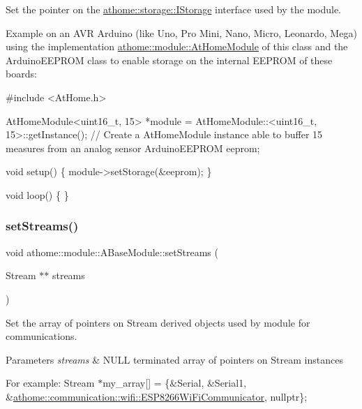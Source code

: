 Set the pointer on the \mbox{\hyperlink{classathome_1_1storage_1_1_i_storage}{athome\+::storage\+::\+I\+Storage}} interface used by the module.

Example on an A\+VR Arduino (like Uno, Pro Mini, Nano, Micro, Leonardo, Mega) using the implementation \mbox{\hyperlink{classathome_1_1module_1_1_at_home_module}{athome\+::module\+::\+At\+Home\+Module}} of this class and the Arduino\+E\+E\+P\+R\+OM class to enable storage on the internal E\+E\+P\+R\+OM of these boards\+:


\begin{DoxyCode}
\textcolor{preprocessor}{#include <AtHome.h>}

AtHomeModule<uint16\_t, 15> *module = AtHomeModule::<uint16\_t,
15>::getInstance(); \textcolor{comment}{// Create a AtHomeModule instance able to buffer 15}
measures from an analog sensor ArduinoEEPROM eeprom;

\textcolor{keywordtype}{void} setup() \{
  module->setStorage(&eeprom);
\}

\textcolor{keywordtype}{void} loop() \{
\}
\end{DoxyCode}
 \mbox{\label{classathome_1_1module_1_1_a_base_module_af1af8e6110a8d0baee15efb2275ae5ae}} 
\subsubsection{\texorpdfstring{set\+Streams()}{setStreams()}}
{\footnotesize\ttfamily void athome\+::module\+::\+A\+Base\+Module\+::set\+Streams (\begin{DoxyParamCaption}\item[{Stream $\ast$$\ast$}]{streams }\end{DoxyParamCaption})}

Set the array of pointers on Stream derived objects used by module for communications.


\begin{DoxyParams}{Parameters}
{\em streams} & N\+U\+LL terminated array of pointers on Stream instances\\
\hline
\end{DoxyParams}
For example\+: {\ttfamily Stream $\ast$my\+\_\+array\mbox{[}\mbox{]} = \{\&Serial, \&Serial1, \&\mbox{\hyperlink{classathome_1_1communication_1_1wifi_1_1_e_s_p8266_wi_fi_communicator}{athome\+::communication\+::wifi\+::\+E\+S\+P8266\+Wi\+Fi\+Communicator}}, nullptr\};}

